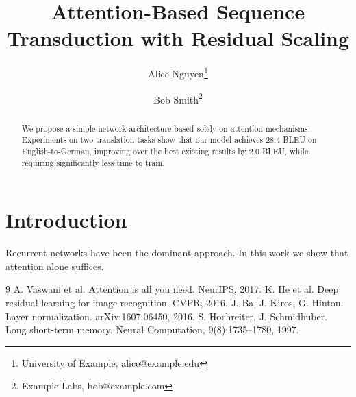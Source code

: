 \documentclass[10pt,twocolumn]{article}
\title{Attention-Based Sequence Transduction with Residual Scaling}
\author{Alice Nguyen\thanks{University of Example, alice@example.edu} \and Bob Smith\thanks{Example Labs, bob@example.com}}
\begin{document}
\maketitle
\begin{abstract}We propose a simple network architecture based solely on attention mechanisms. Experiments on two translation tasks show that our model achieves 28.4 BLEU on English-to-German, improving over the best existing results by 2.0 BLEU, while requiring significantly less time to train.\end{abstract}
\section{Introduction}Recurrent networks \cite{hochreiter1997} have been the dominant approach. In this work we show that attention alone suffices.

\begin{thebibliography}{9}
 A. Vaswani et al. Attention is all you need. NeurIPS, 2017.
 K. He et al. Deep residual learning for image recognition. CVPR, 2016.
 J. Ba, J. Kiros, G. Hinton. Layer normalization. arXiv:1607.06450, 2016.
 S. Hochreiter, J. Schmidhuber. Long short-term memory. Neural Computation, 9(8):1735--1780, 1997.
\end{thebibliography}
\end{document}
